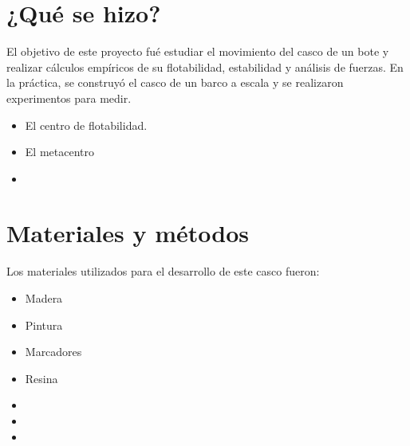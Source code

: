 \documentclass[a4paper,letterpaper]{article}
\begin{document}
\section*{¿Qué se hizo?}
El objetivo de este proyecto fué estudiar el movimiento del casco de un bote y realizar cálculos empíricos
de su flotabilidad, estabilidad y análisis de fuerzas. En la práctica, se construyó el casco de un barco a escala y se realizaron experimentos para medir.
\begin{itemize}
	\item El centro de flotabilidad.
	\item El metacentro
	\item
\end{itemize}
\section*{Materiales y métodos}
Los materiales utilizados para el desarrollo de este casco fueron:
\begin{itemize}
	\item Madera
	\item Pintura
	\item Marcadores
	\item Resina
	\item
	\item
	\item
\end{itemize}

\newpage
\end{document}
